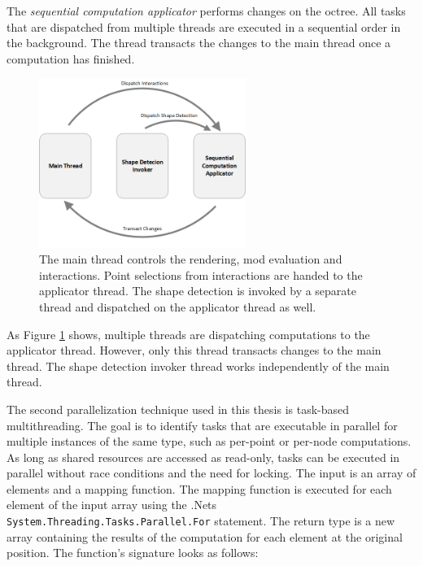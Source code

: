 \par

The \textit{sequential computation applicator} performs changes on the octree. All tasks that are dispatched from multiple threads are executed in a sequential order in the background. The thread transacts the changes to the main thread once a computation has finished. 

\begin{figure}[b]
    \centering
    \includegraphics[width=0.6\textwidth]{Implementation/multiThreading.png}
    \caption[Overview on the multi-threaded environment of the application]
		{The main thread controls the rendering, mod evaluation and interactions. Point selections from interactions are handed to the applicator thread. The shape detection is invoked by a separate thread and dispatched on the applicator thread as well.  }
    \label{fig:multiThreading}
\end{figure}

As Figure \ref{fig:multiThreading} shows, multiple threads are dispatching computations to the applicator thread. However, only this thread transacts changes to the main thread. The shape detection invoker thread works independently of the main thread. 

\par

The second parallelization technique used in this thesis is task-based multithreading. The goal is to identify tasks that are executable in parallel for multiple instances of the same type, such as per-point or per-node computations. As long as shared resources are accessed as read-only, tasks can be executed in parallel without race conditions and the need for locking. The input is an array of elements and a mapping function. The mapping function is executed for each element of the input array using the .Nets \verb|System.Threading.Tasks.Parallel.For| statement. The return type is a new array containing the results of the computation for each element at the original position. The function's signature looks as follows: 


